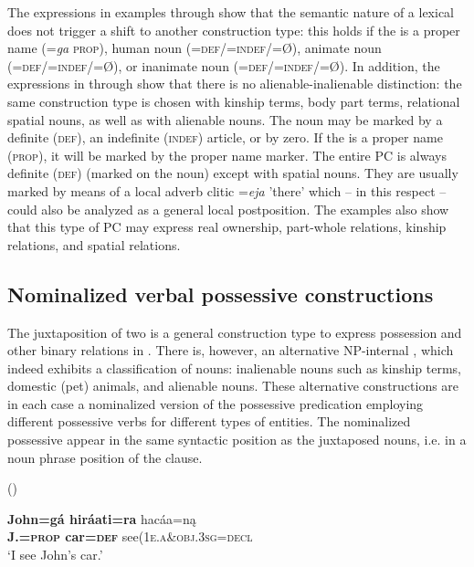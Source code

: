 \documentclass[output=paper]{LSP/langsci}
\begin{document}
The expressions in examples  through  show that the semantic nature of a lexical  does not trigger a shift to another construction type: this holds if the  is a proper name (=\textit{ga} \textsc{prop}), human noun (=\textsc{def/=indef/}=Ø), animate noun (=\textsc{def/=indef}/=Ø), or inanimate noun (=\textsc{def/=indef}/=Ø). In addition, the expressions in  through  show that there is no alienable-inalienable distinction: the same construction type is chosen with kinship terms, body part terms, relational spatial nouns, as well as with alienable nouns. The  noun may be marked by a definite (\textsc{def}), an indefinite (\textsc{indef}) article, or by zero. If the  is a proper name (\textsc{prop}), it will be marked by the proper name marker. The entire PC is always definite (\textsc{def}) (marked on the  noun) except with spatial nouns. They are usually marked by means of a local adverb clitic =\textit{eja} 'there' which – in this respect – could also be analyzed as a general local postposition. The examples also show that this type of PC may express real ownership, part-whole relations, kinship relations, and spatial relations.
 
\subsection{Nominalized verbal possessive constructions}\label{sec:helmbrecht:3.2} \label{nomvposs}

The juxtaposition of two  is a general construction type to express possession and other binary relations in . There is, however, an alternative NP-internal , which indeed exhibits a classification of nouns: inalienable nouns such as kinship terms, domestic (pet) animals, and alienable nouns. These alternative constructions are in each case a nominalized version of the possessive predication employing different possessive verbs for different types of  entities. The nominalized possessive  appear in the same syntactic position as the juxtaposed nouns, i.e. in a noun phrase position of the clause. 

\ea {} (\citealt[16]{Helmbrecht2003}) \label{seecar}

\ea 
\gll \textbf{John=g\'a hir\'aati=ra}  hac\'aa=n\k{a} \\
\textbf{J.=\textsc{prop} car=\textsc{def}} see(\textsc{1e.a}\&\textsc{obj.3sg}=\textsc{decl} \\
\glt `I see John's car.'  
\end{document}
